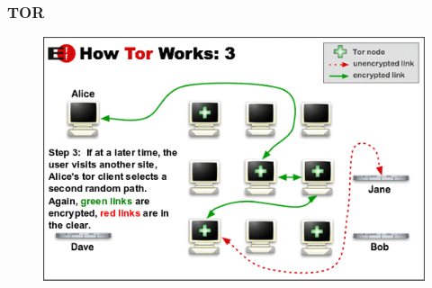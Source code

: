 \documentclass[12pt]{beamer}
\begin{document}
\begin{frame}
  \frametitle{TOR}
  \begin{figure}
    \includegraphics[height=0.7\textheight]{img/tor-3.png}
  \end{figure}
\end{frame}
\end{document}
